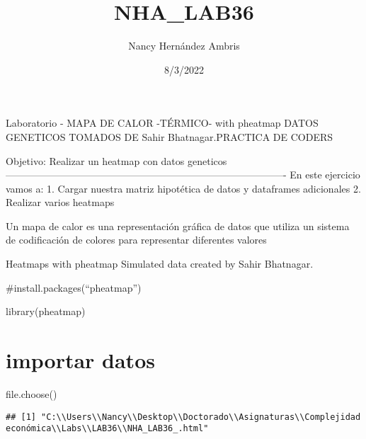 \documentclass[
]{article}
\title{NHA\_LAB36}
\author{Nancy Hernández Ambris}
\date{8/3/2022}
\newenvironment{Shaded}{\begin{snugshade}}{\end{snugshade}}
\newcommand{\FunctionTok}[1]{\textcolor[rgb]{0.00,0.00,0.00}{#1}}
\newcommand{\NormalTok}[1]{#1}
\begin{document}
\maketitle

Laboratorio - MAPA DE CALOR -TÉRMICO- with pheatmap DATOS GENETICOS
TOMADOS DE Sahir Bhatnagar.PRACTICA DE CODERS

Objetivo: Realizar un heatmap con datos geneticos
-------------------------------------------------------------------------------------
En este ejercicio vamos a: 1. Cargar nuestra matriz hipotética de datos
y dataframes adicionales 2. Realizar varios heatmaps

Un mapa de calor es una representación gráfica de datos que utiliza un
sistema de codificación de colores para representar diferentes valores

Heatmaps with pheatmap Simulated data created by Sahir Bhatnagar.

\#install.packages(``pheatmap'')

\begin{Shaded}
\begin{Highlighting}[]
\FunctionTok{library}\NormalTok{(pheatmap)}
\end{Highlighting}
\end{Shaded}

\hypertarget{importar-datos}{%
\section{importar datos}\label{importar-datos}}

\begin{Shaded}
\begin{Highlighting}[]
\FunctionTok{file.choose}\NormalTok{()}
\end{Highlighting}
\end{Shaded}

\begin{verbatim}
## [1] "C:\\Users\\Nancy\\Desktop\\Doctorado\\Asignaturas\\Complejidad económica\\Labs\\LAB36\\NHA_LAB36_.html"
\end{verbatim}
\end{document}
